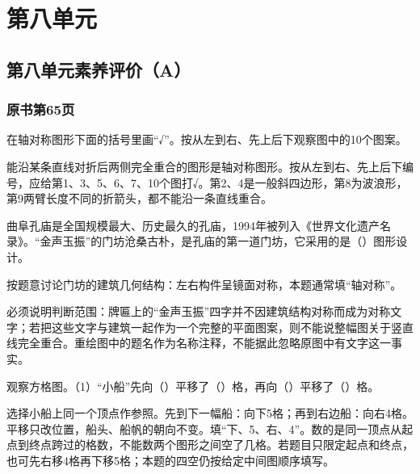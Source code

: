 \chapter{第八单元}


\section{第八单元素养评价（A）}



\subsection*{原书第65页}

在轴对称图形下面的括号里画“√”。按从左到右、先上后下观察图中的10个图案。\par
{}
\begin{BookAnswer}
能沿某条直线对折后两侧完全重合的图形是轴对称图形。按从左到右、先上后下编号，应给第1、3、5、6、7、10个图打√。第2、4是一般斜四边形，第8为波浪形，第9两臂长度不同的折箭头，都不能沿一条直线重合。
\end{BookAnswer}

曲阜孔庙是全国规模最大、历史最久的孔庙，1994年被列入《世界文化遗产名录》。“金声玉振”的门坊沧桑古朴，是孔庙的第一道门坊，它采用的是（\hspace{1.8em}）图形设计。\par
{}
\begin{BookAnswer}
按题意讨论门坊的建筑几何结构：左右构件呈镜面对称，本题通常填“轴对称”。\par 必须说明判断范围：牌匾上的“金声玉振”四字并不因建筑结构对称而成为对称文字；若把这些文字与建筑一起作为一个完整的平面图案，则不能说整幅图关于竖直线完全重合。重绘图中的题名作为名称注释，不能据此忽略原图中有文字这一事实。
\end{BookAnswer}

观察方格图。（1）“小船”先向（\hspace{1.8em}）平移了（\hspace{1.8em}）格，再向（\hspace{1.8em}）平移了（\hspace{1.8em}）格。\par
{}
\begin{BookAnswer}
选择小船上同一个顶点作参照。先到下一幅船：向下5格；再到右边船：向右4格。平移只改位置，船头、船帆的朝向不变。填“下、5、右、4”。数的是同一顶点从起点到终点跨过的格数，不能数两个图形之间空了几格。若题目只限定起点和终点，也可先右移4格再下移5格；本题的四空仍按给定中间图顺序填写。
\end{BookAnswer}

